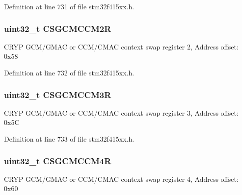 Definition at line 731 of file stm32f415xx.\+h.

\subsubsection[{\texorpdfstring{C\+S\+G\+C\+M\+C\+C\+M2R}{CSGCMCCM2R}}]{ uint32\+\_\+t C\+S\+G\+C\+M\+C\+C\+M2R}\hypertarget{struct_c_r_y_p___type_def_ad839981b06af83bb1d08dd3313922783}{}\label{struct_c_r_y_p___type_def_ad839981b06af83bb1d08dd3313922783}
C\+R\+YP G\+C\+M/\+G\+M\+AC or C\+C\+M/\+C\+M\+AC context swap register 2, Address offset\+: 0x58 

Definition at line 732 of file stm32f415xx.\+h.

\subsubsection[{\texorpdfstring{C\+S\+G\+C\+M\+C\+C\+M3R}{CSGCMCCM3R}}]{ uint32\+\_\+t C\+S\+G\+C\+M\+C\+C\+M3R}\hypertarget{struct_c_r_y_p___type_def_a146a0ff395793669bb88fbad8697fdff}{}\label{struct_c_r_y_p___type_def_a146a0ff395793669bb88fbad8697fdff}
C\+R\+YP G\+C\+M/\+G\+M\+AC or C\+C\+M/\+C\+M\+AC context swap register 3, Address offset\+: 0x5C 

Definition at line 733 of file stm32f415xx.\+h.

\subsubsection[{\texorpdfstring{C\+S\+G\+C\+M\+C\+C\+M4R}{CSGCMCCM4R}}]{ uint32\+\_\+t C\+S\+G\+C\+M\+C\+C\+M4R}\hypertarget{struct_c_r_y_p___type_def_a0701e3347dd3d6de80063b802bcf011f}{}\label{struct_c_r_y_p___type_def_a0701e3347dd3d6de80063b802bcf011f}
C\+R\+YP G\+C\+M/\+G\+M\+AC or C\+C\+M/\+C\+M\+AC context swap register 4, Address offset\+: 0x60 

